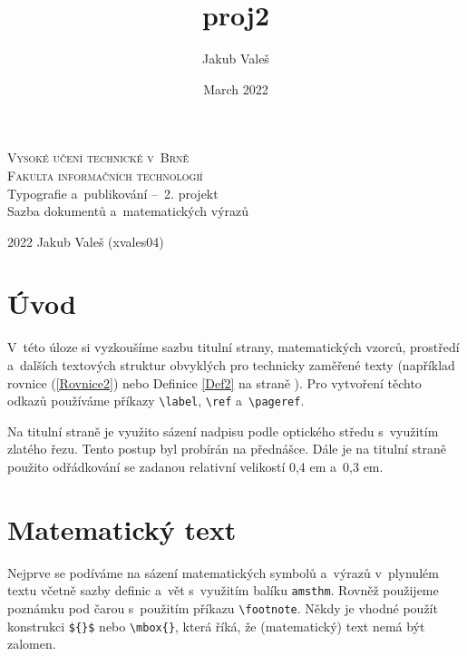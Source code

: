 \documentclass[twocolumn, a4paper, 11pt]{article}
\title{proj2}
\author{Jakub Valeš }
\date{March 2022}
\begin{document}
    \begin{titlepage}
        \begin{center}
            \textsc
            {\Huge{Vysoké učení technické v~Brně}\\[0.4em]
            {\huge Fakulta informačních technologií}}\\[0.3em]
            {\huge Typografie a~publikování --\ 2. projekt\\
            Sazba dokumentů a~matematických výrazů}\\
        \end{center}
    {\LARGE 2022 \hfill Jakub Valeš (xvales04)}
    \end{titlepage}
    
\section*{Úvod}
    V~této úloze si vyzkoušíme sazbu titulní strany, matematických vzorců, prostředí a~dalších textových struktur obvyklých pro technicky zaměřené texty (například rovnice (\ref{Rovnice2}) nebo Definice \ref{Def2} na straně \pageref{Def2}). Pro vytvoření těchto odkazů používáme příkazy \verb|\label|, \verb|\ref| a~\verb|\pageref|.
    
    Na titulní straně je využito sázení nadpisu podle optického středu s~využitím zlatého řezu. Tento postup byl probírán na přednášce. Dále je na titulní straně použito odřádkování se zadanou relativní velikostí 0,4 em a~0,3 em.


\section{Matematický text}
    Nejprve se podíváme na sázení matematických symbolů a~výrazů v~plynulém textu včetně sazby definic a~vět s~využitím balíku \texttt{amsthm}. Rovněž použijeme poznámku pod čarou s~použitím příkazu \verb|\footnote|. Někdy je vhodné použít konstrukci \verb|${}$| nebo \verb|\mbox{}|, která říká, že (matematický) text nemá být zalomen. 
    
\end{document}
